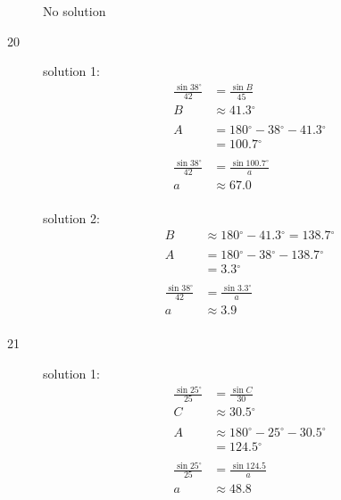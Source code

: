 \documentclass{exam}
\newcommand{\dg}{\ensuremath{^\circ}}
\begin{document}
\begin{description}
        No solution

      \item[20] 
        solution 1:
        \begin{align*}
          \frac{\sin 38 \dg}{42} & = \frac{\sin B}{45} \\
          B                      & \approx \boxed{ 41.3 \dg } \\
          \\
          A & = 180 \dg - 38 \dg - 41.3 \dg  \\
            & = \boxed{ 100.7 \dg } \\ 
          \\
          \frac{\sin 38 \dg}{42} & = \frac{\sin 100.7 \dg}{a} \\
          a                      & \approx \boxed{ 67.0 } \\
        \end{align*}

        solution 2:
        \begin{align*}
          B & \approx 180 \dg - 41.3 \dg = 138.7 \dg \\
          \\
          A & = 180 \dg - 38 \dg - 138.7 \dg  \\
            & = \boxed{ 3.3 \dg } \\ 
          \\
          \frac{\sin 38 \dg}{42} & = \frac{\sin 3.3 \dg}{a} \\
          a                      & \approx \boxed{ 3.9 } \\
        \end{align*}

      \item[21] 
        solution 1:
        \begin{align*}
          \frac{\sin 25 \dg}{25} & = \frac{\sin C}{30} \\
          C                      & \approx \boxed{ 30.5 \dg } \\
          \\
          A & \approx 180 \dg - 25 \dg - 30.5 \dg \\
            & = \boxed{ 124.5 \dg } \\
          \\
          \frac{\sin 25 \dg}{25} & = \frac{\sin 124.5}{a} \\
          a                      & \approx \boxed{ 48.8 } \\
        \end{align*}


\end{description}
\end{document}
